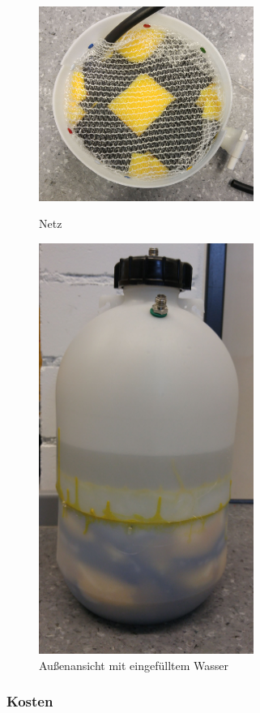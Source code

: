 \begin{figure}[h]
	\begin{minipage}[hbt]{7cm}
		\centering
		\includegraphics[width=7cm]{Luftbefeuchter_Netz.jpg}
		\caption{Netz}
	\end{minipage}
	\hfill
	\begin{minipage}[hbt]{7cm}
		\centering
		\includegraphics[width=7cm]{Luftbefeuchter_gesamt.jpg}
		\caption{Außenansicht mit eingefülltem Wasser}
	\end{minipage}
\end{figure}


\subsubsection{Kosten}

